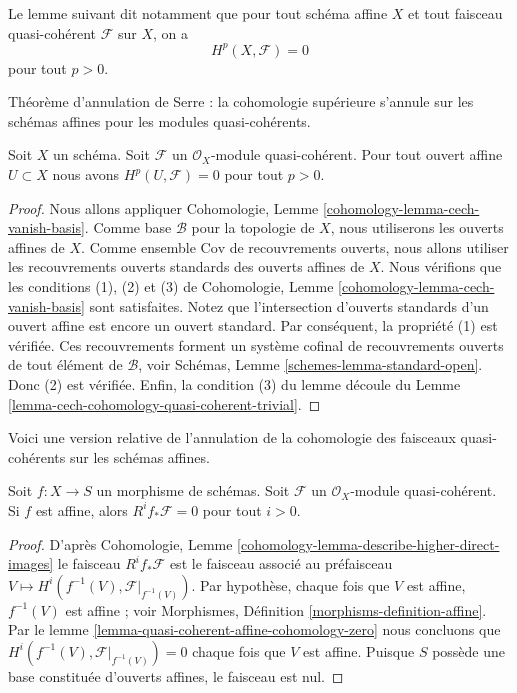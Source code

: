 \noindent
Le lemme suivant dit notamment que pour tout schéma affine $X$ et tout faisceau
quasi-cohérent $\mathcal{F}$ sur $X$, on a
$$
H^p(X, \mathcal{F}) = 0
$$
pour tout $p > 0$.

\begin{lemma}
\label{lemma-quasi-coherent-affine-cohomology-zero}
\begin{slogan}
Théorème d'annulation de Serre : la cohomologie supérieure s'annule sur les
schémas affines pour les modules quasi-cohérents.
\end{slogan}
Soit $X$ un schéma. Soit $\mathcal{F}$ un $\mathcal{O}_X$-module
quasi-cohérent. Pour tout ouvert affine $U \subset X$ nous avons $H^p(U, \mathcal{F}) = 0$ pour tout $p > 0$.
\end{lemma}

\begin{proof}
Nous allons appliquer Cohomologie, Lemme
\ref{cohomology-lemma-cech-vanish-basis}. Comme base $\mathcal{B}$ pour la
topologie de $X$, nous utiliserons les ouverts affines de $X$. Comme
ensemble $\text{Cov}$ de recouvrements ouverts, nous allons utiliser les
recouvrements ouverts standards des ouverts affines de $X$. Nous
vérifions que les conditions (1), (2) et (3) de Cohomologie, Lemme
\ref{cohomology-lemma-cech-vanish-basis} sont satisfaites. Notez que
l'intersection d'ouverts standards d'un ouvert affine est encore un ouvert
standard. Par conséquent, la propriété (1) est vérifiée. Ces recouvrements
forment un système cofinal de recouvrements ouverts de tout élément de
$\mathcal{B}$, voir Schémas, Lemme \ref{schemes-lemma-standard-open}. Donc (2)
est vérifiée.
Enfin, la condition (3) du lemme découle du Lemme
\ref{lemma-cech-cohomology-quasi-coherent-trivial}.
\end{proof}

\noindent
Voici une version relative de l'annulation de la cohomologie des faisceaux
quasi-cohérents sur les schémas affines.

\begin{lemma}
\label{lemma-relative-affine-vanishing}
Soit $f : X \to S$ un morphisme de schémas. Soit $\mathcal{F}$ un
$\mathcal{O}_X$-module quasi-cohérent. Si $f$ est affine, alors
$R^if_*\mathcal{F} = 0$
pour tout $i > 0$.
\end{lemma}

\begin{proof}
D'après Cohomologie, Lemme
\ref{cohomology-lemma-describe-higher-direct-images} le faisceau
$R^if_*\mathcal{F}$ est le faisceau associé au préfaisceau
$V \mapsto H^i(f^{-1}(V), \mathcal{F}|_{f^{-1}(V)})$. Par hypothèse, chaque
fois que $V$ est affine, $f^{-1}(V)$ est affine ; voir Morphismes, Définition
\ref{morphisms-definition-affine}. Par le lemme
\ref{lemma-quasi-coherent-affine-cohomology-zero} nous concluons que
$H^i(f^{-1}(V), \mathcal{F}|_{f^{-1}(V)}) = 0$ chaque fois que $V$ est affine.
Puisque $S$ possède une base constituée d'ouverts affines, le faisceau est nul.
\end{proof}

